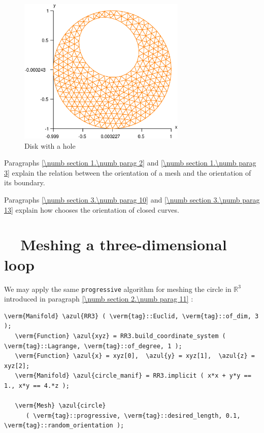 \begin{figure}[ht] \centering
 \includegraphics[width=80mm]{disk-with-hole}
  \caption{Disk with a hole}
  \label{\numb section 3.\numb fig 2}
\end{figure}

Paragraphs \ref{\numb section 1.\numb parag 2} and \ref{\numb section 1.\numb parag 3} explain
the relation between the orientation of a mesh and the orientation of its boundary.

Paragraphs \ref{\numb section 3.\numb parag 10} and \ref{\numb section 3.\numb parag 13}
explain how {\maniFEM} chooses the orientation of closed curves.


\section{~~Meshing a three-dimensional loop}\label{\numb section 3.\numb parag 4}

We may apply the same {\small\tt progressive} algorithm for meshing the circle in
$ \mathbb{R}^3 $ introduced in paragraph \ref{\numb section 2.\numb parag 11} :

\begin{Verbatim}[commandchars=\\\{\},formatcom=\small\tt,frame=single,
   label=parag-\ref{\numb section 3.\numb parag 4}.cpp,rulecolor=\color{coment},
   baselinestretch=0.94,framesep=2mm                                            ]
   \verm{Manifold} \azul{RR3} ( \verm{tag}::Euclid, \verm{tag}::of_dim, 3 );
   \verm{Function} \azul{xyz} = RR3.build_coordinate_system ( \verm{tag}::Lagrange, \verm{tag}::of_degree, 1 );
   \verm{Function} \azul{x} = xyz[0],  \azul{y} = xyz[1],  \azul{z} = xyz[2];
   \verm{Manifold} \azul{circle_manif} = RR3.implicit ( x*x + y*y == 1., x*y == 4.*z );
   
   \verm{Mesh} \azul{circle}
      ( \verm{tag}::progressive, \verm{tag}::desired_length, 0.1, \verm{tag}::random_orientation );
\end{Verbatim}

